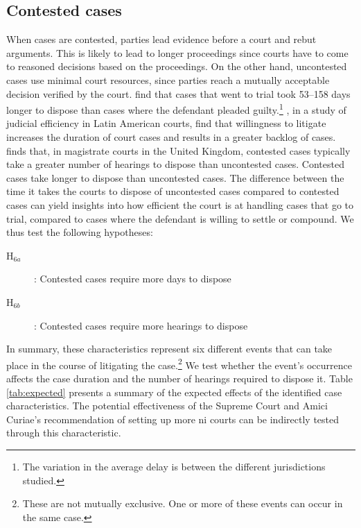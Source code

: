 \begin{enumerate}
\begin{enumerate}
\subsection{Contested cases}
\label{sec:contested_cases_meth}
When cases are contested, parties lead evidence before a court and rebut arguments. This is likely to lead to longer proceedings since courts have to come to reasoned decisions based on the proceedings. On the other hand, uncontested cases use minimal court resources, since parties reach a mutually acceptable decision verified by the court. \textcite{ostrom2000efficiency} find that cases that went to trial took 53--158 days longer to dispose than cases where the defendant pleaded guilty.\footnote{The variation in the average delay is between the different jurisdictions studied.} \textcite{buscaglia1997_latinAmericaCourtDelays}, in a study of judicial efficiency in Latin American courts, find that willingness to litigate increases the duration of court cases and results in a greater backlog of cases. \textcite{crownProsecutionService2006_magistrateCourtEfficiency} finds that, in magistrate courts in the United Kingdom, contested cases typically take a greater number of hearings to dispose than uncontested cases. Contested cases take longer to dispose than uncontested cases. The difference between the time it takes the courts to dispose of uncontested cases compared to contested cases can yield insights into how efficient the court is at handling cases that go to trial, compared to cases where the defendant is willing to settle or compound. We thus test the following hypotheses:

\begin{description}
\item[H$_{6a}$]: Contested cases require more days to dispose
\item[H$_{6b}$]: Contested cases require more hearings to dispose
\end{description}

In summary, these characteristics represent six different events that can take place in the course of litigating the case.\footnote{These are not mutually exclusive. One or more of these events can occur in the same case.} We test whether the event's occurrence affects the case duration and the number of hearings required to dispose it. Table \ref{tab:expected} presents a summary of the expected effects of the identified case characteristics. The potential effectiveness of the Supreme Court and Amici Curiae's recommendation of setting up more \gls{ni} courts can be indirectly tested through this characteristic. 


\end{enumerate}
\end{enumerate}
